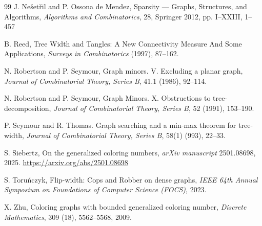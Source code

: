 \documentclass[final]{dmtcs-episciences}
\theoremstyle{definition}
\theoremstyle{remark}
\begin{document}
\begin{thebibliography}{99}
 J. Ne\v{s}et\v{r}il and P. {Ossona de Mendez}, Sparsity --- {G}raphs, {S}tructures, and {A}lgorithms, 
\emph{Algorithms and {C}ombinatorics}, 28, Springer 2012, pp. I--XXIII, 1--457

 B. Reed, Tree Width and Tangles: A New Connectivity Measure And Some Applications, \emph{Surveys in Combinatorics} (1997), 87--162.

 N. Robertson and P. Seymour, Graph minors. V. Excluding a planar graph, \emph{Journal of Combinatorial Theory, Series B}, 41.1 (1986), 92--114.

 N. Robertson and P. Seymour, Graph Minors. X. Obstructions to tree-decomposition,
\emph{Journal of Combinatorial Theory, Series B}, 52 (1991),
153--190.

 P. Seymour and R. Thomas. Graph searching and a
  min-max theorem for tree-width, \emph{Journal of Combinatorial Theory, Series B}, {58(1)} (993), 22--33.  

 S. Siebertz, On the generalized coloring numbers, \emph{arXiv manuscript} 2501.08698, 2025. \url{https://arxiv.org/abs/2501.08698}

 S. Toru\'nczyk, Flip-width: Cops and Robber on dense graphs, \emph{IEEE 64th Annual Symposium on Foundations of Computer Science (FOCS)}, 2023.

 X. Zhu, Coloring graphs with bounded generalized coloring number, \emph{Discrete Mathematics}, {309 (18)}, 5562--5568, 2009.

\end{thebibliography} 


%
%
%
%
\end{document}
